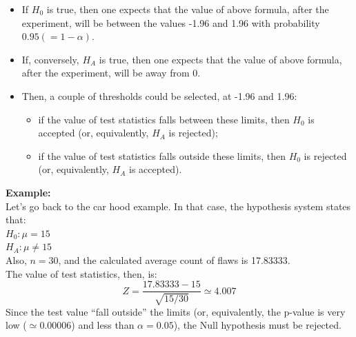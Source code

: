 \begin{frame}
 \begin{itemize}
  \vspace{0.25cm}
  \item If $H_0$ is true, then one expects that the value of above formula, after the experiment, will be between the values -1.96 and 1.96 with probability $0.95 (=1-\alpha)$.
  \vspace{0.25cm}
  \item If, conversely, $H_A$ is true, then one expects that the value of above formula, after the experiment, will be away from 0.
  \vspace{0.25cm}
  \item Then, a couple of thresholds could be selected, at -1.96 and 1.96: 
  \begin{itemize}
    \item if the value of test statistics falls between these limits, then $H_0$ is accepted (or, equivalently, $H_A$ is rejected); 
    \item if the value of test statistics falls outside these limits, then $H_0$ is rejected (or, equivalently, $H_A$ is accepted).
  \end{itemize}
 \end{itemize}
\end{frame}

\begin{frame}
  \vspace{.15cm}
  \textbf{Example:}\\
  Let's go back to the car hood example. In that case, the hypothesis system states that:\\
  $H_0: \mu=15$\\
  $H_A: \mu \neq 15$\\
  \vspace{.25cm}
  Also, $n=30$, and the calculated average count of flaws is 17.83333.\\
  The value of test statistics, then, is:\\
  \vspace{.25cm}
  $$Z=\dfrac{17.83333-15}{\sqrt{15/30}}\simeq 4.007$$
  Since the test value ``fall outside'' the limits (or, equivalently, the p-value is very low ($\simeq 0.00006$) and less than $\alpha=0.05$), the Null hypothesis must be rejected.
\end{frame}

